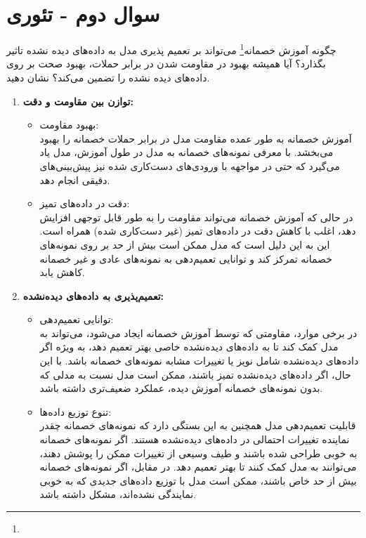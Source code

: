 \section{سوال دوم - تئوری}
چگونه آموزش خصمانه\footnote{} می‌تواند بر تعمیم پذیری مدل به داده‌های دیده نشده تاثیر بگذارد؟ آیا همیشه بهبود در مقاومت شدن در برابر حملات، بهبود صحت بر روی داده‌های دیده نشده را تضمین می‌کند؟ نشان دهید.


\begin{qsolve}
	\begin{enumerate}
		\item \textbf{توازن بین مقاومت و دقت: }
		\begin{itemize}
			\item بهبود مقاومت:\\
آموزش خصمانه به طور عمده مقاومت مدل در برابر حملات خصمانه را بهبود می‌بخشد. با معرفی نمونه‌های خصمانه به مدل در طول آموزش، مدل یاد می‌گیرد که حتی در مواجهه با ورودی‌های دست‌کاری شده نیز پیش‌بینی‌های دقیقی انجام دهد.


			\item دقت در داده‌های تمیز:\\
در حالی که آموزش خصمانه می‌تواند مقاومت را به طور قابل توجهی افزایش دهد، اغلب با کاهش دقت در داده‌های تمیز (غیر دست‌کاری شده) همراه است. این به این دلیل است که مدل ممکن است بیش از حد بر روی نمونه‌های خصمانه تمرکز کند و توانایی تعمیم‌دهی به نمونه‌های عادی و غیر خصمانه کاهش یابد.
		\end{itemize}
		
		
		
		\item \textbf{تعمیم‌پذیری به داده‌های دیده‌نشده: }
		\begin{itemize}
			\item توانایی تعمیم‌دهی:\\
در برخی موارد، مقاومتی که توسط آموزش خصمانه ایجاد می‌شود، می‌تواند به مدل کمک کند تا به داده‌های دیده‌نشده خاصی بهتر تعمیم دهد، به ویژه اگر داده‌های دیده‌نشده شامل نویز یا تغییرات مشابه نمونه‌های خصمانه باشد. با این حال، اگر داده‌های دیده‌نشده تمیز باشند، ممکن است مدل نسبت به مدلی که بدون نمونه‌های خصمانه آموزش دیده، عملکرد ضعیف‌تری داشته باشد.
			
			\item تنوع توزیع داده‌ها:\\
قابلیت تعمیم‌دهی مدل همچنین به این بستگی دارد که نمونه‌های خصمانه چقدر نماینده تغییرات احتمالی در داده‌های دیده‌نشده هستند. اگر نمونه‌های خصمانه به خوبی طراحی شده باشند و طیف وسیعی از تغییرات ممکن را پوشش دهند، می‌توانند به مدل کمک کنند تا بهتر تعمیم دهد. در مقابل، اگر نمونه‌های خصمانه بیش از حد خاص باشند، ممکن است مدل با توزیع داده‌های جدیدی که به خوبی نمایندگی نشده‌اند، مشکل داشته باشد.
		\end{itemize}
	\end{enumerate}
	

\end{qsolve}
